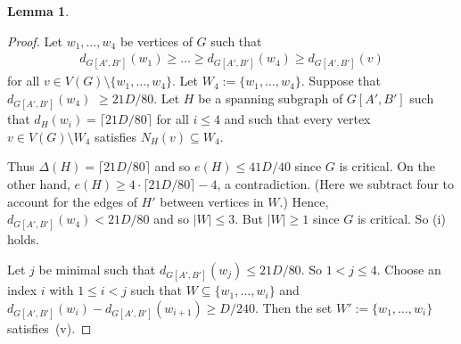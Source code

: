 \documentclass{memo-l}
\newtheorem{lemma}[firstthm]{Lemma}
\def\COMMENT#1{}
\numberwithin{section}{chapter}
\numberwithin{equation}{section}
\numberwithin{firstthm}{section}
\numberwithin{figure}{section}
\begin{document}
{\begin{lemma}
\end{lemma}
\begin{proof}
Let $w_1, \dots, w_4$ be vertices of $G$ such that 
\begin{align*}
d_{G[A',B']}(w_1) \ge \dots \ge d_{G[A',B']}(w_4) \ge d_{G[A',B']}(v)
\end{align*}
for all $v \in V(G) \setminus \{w_1, \dots, w_4\}$. Let $W_4:=\{w_1, \dots, w_4\}$. Suppose that $d_{G[A',B']}(w_4)$ $\ge 21D/80$.
Let $H$ be a spanning subgraph of $G[A',B']$ such that
$d_H(w_i)= \lceil 21D/80\rceil$ for all $i\le 4$ and such that every vertex $v\in V(G)\setminus W_4$ satisfies
$N_H(v)\subseteq W_4$.%
    \COMMENT{Such a $H$ can be obtained by starting with $G[A'\cap W_4,B'\cap W_4]$ and adding suitable further edges.}
Thus $\Delta(H)= \lceil 21D/80\rceil$ and so $e(H) \le 41D/40$ since $G$ is critical. On the other hand, $e(H)\ge 4\cdot \lceil 21D/80\rceil -4$,
a contradiction. (Here we subtract four to account for the edges of $H'$ between vertices in $W$.)
Hence, $d_{G[A',B']}(w_4) < 21 D /80$ and so $|W|\le 3$. But $|W|\ge 1$ since $G$ is critical. So (i) holds.

Let $j$ be minimal such that
$d_{G[A',B']}(w_j)\le 21D/80$. So $1<j\le 4$. Choose an index $i$ with $1\le i<j$ such that
$W\subseteq \{w_1,\dots,w_i\}$ and $d_{G[A',B']}(w_i) - d_{G[A',B']}(w_{i+1}) \ge D/240$.
Then the set $W':=\{w_1,\dots,w_i\}$ satisfies~(v).


\end{proof}}
\end{document}
